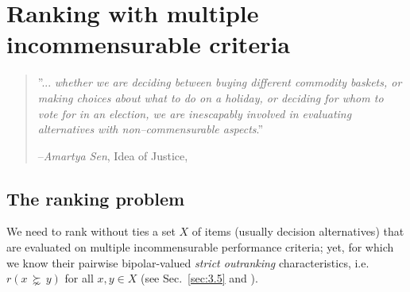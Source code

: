 \chapter{Ranking with multiple incommensurable criteria}
\label{sec:8}


\begin{quotation}''... \emph{whether we are deciding between buying different commodity baskets, or making choices about what to do on a holiday, or deciding for whom to vote for in an election, we are inescapably involved in evaluating alternatives with non–commensurable aspects}.''

  --\emph{Amartya Sen}, Idea of Justice, \citep{SEN-2009}
\end{quotation}
\vspace{1cm}


\section{The ranking problem}
\label{sec:8.1}

We need to rank without ties a set $X$ of items (usually decision alternatives) that are evaluated on multiple incommensurable performance criteria; yet, for which we know their pairwise bipolar-valued \emph{strict outranking} characteristics, i.e. $r(x\, \succnsim \, y)$ for all $x, y \in X$ (see Sec.~\ref{sec:3.5} and \citep{BIS-2013}).

